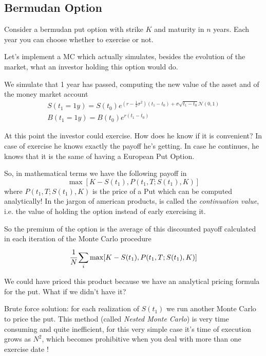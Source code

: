 \documentclass[12pt,a4paper]{article}
\begin{document}
\subsection{Bermudan Option}
Consider a bermudan put option with strike $K$ and maturity in $n$ years. Each year you can choose whether to exercise or not.

Let's implement a MC which actually simulates, besides the evolution of the market, what an investor holding this option would do. 

We simulate that 1 year has passed, computing the new value of the asset and of the money market account
\begin{equation}
	\begin{gathered}
		S(t_1=1y) = S(t_0)e^{(r-\frac{1}{2}\sigma^2)(t_1-t_0)+\sigma\sqrt{t_1-t_0}\mathcal{N}(0,1)} \\
		B(t_1=1y)=B(t_0)e^{r(t_1-t_0)}
	\end{gathered}
\end{equation}

At this point the investor could exercise. How does he know if it is convenient? In case of exercise he knows exactly the payoff he's getting. In case he continues, he knows that it is the same of having a European Put Option.

So, in mathematical terms we have the following payoff in 
\begin{equation}
	\max[K-S(t_1), P(t_1,T;S(t_1),K)]
\end{equation}
where $P(t_1,T;S(t_1),K)$ is the price of a Put which can be computed analytically! In the jargon of american products, 
is called the \emph{continuation value}, i.e. the value of holding the option instead of early exercising it.

So the premium of the option is the average of this discounted payoff calculated in each iteration of the Monte Carlo procedure
\begin{equation}
	\cfrac{1}{N}\sum_i\max[K-S(t_1), P(t_1,T;S(t_1),K)]
\end{equation}

We could have priced this product because we have an analytical pricing formula for the put. What if we didn't have it?

Brute force solution: for each realization of $S(t_1)$ we run another Monte Carlo to price the put. This method (called \emph{Nested Monte Carlo}) is very time consuming and quite inefficient, for this very simple case it's time of execution grows as $N^2$, which becomes prohibitive when you deal with more than one exercise date !
\end{document}
